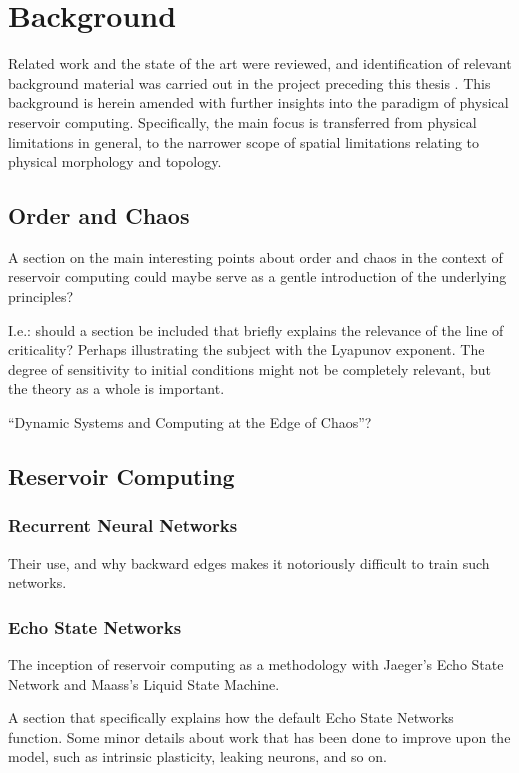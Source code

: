 \chapter{Background}

Related work and the state of the art were reviewed, and identification of
relevant background material was carried out in the project preceding this
thesis \cite{aven_exploring_2019}. This background is herein amended with
further insights into the paradigm of physical reservoir
computing. Specifically, the main focus is transferred from physical limitations
in general, to the narrower scope of spatial limitations relating to physical
morphology and topology.

\section{Order and Chaos}

A section on the main interesting points about order and chaos in the context of
reservoir computing could maybe serve as a gentle introduction of the underlying
principles?

I.e.: should a section be included that briefly explains the relevance of the
line of criticality? Perhaps illustrating the subject with the Lyapunov
exponent. The degree of sensitivity to initial conditions might not be
completely relevant, but the theory as a whole is important.

``Dynamic Systems and Computing at the Edge of Chaos''?

\section{Reservoir Computing}

\subsection{Recurrent Neural Networks}

Their use, and why backward edges makes it notoriously difficult to train such
networks.

\subsection{Echo State Networks}

The inception of reservoir computing as a methodology with Jaeger's Echo State
Network and Maass's Liquid State Machine.

A section that specifically explains how the default Echo State Networks
function. Some minor details about work that has been done to improve upon the
model, such as intrinsic plasticity, leaking neurons, and so on.


